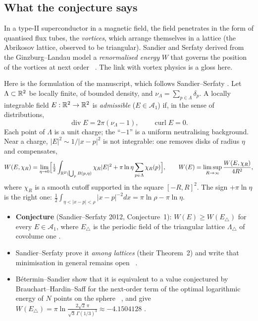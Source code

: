 \subsection{What the conjecture says}\label{ch2:ssec:ssconj}
\begin{physbox}
In a type-II superconductor in a magnetic field, the field penetrates in the form of quantised flux tubes,
the \emph{vortices}, which arrange themselves in a lattice (the Abrikosov lattice, observed to be triangular). Sandier and Serfaty
derived from the Ginzburg--Landau model a \emph{renormalised energy} $W$ that governs the position of the vortices at
next order~\cite{ch2ss} \tierL. The link with vortex physics is a \tierC{} gloss here.
\end{physbox}
Here is the formulation of the manuscript, which follows Sandier--Serfaty \tierL. Let $\Lambda\subset\mathbb{R}^2$ be locally
finite, of bounded density, and $\nu_\Lambda=\sum_{p\in\Lambda}\delta_p$. A locally integrable field $E:\mathbb{R}^2\to\mathbb{R}^2$ is
\emph{admissible} ($E\in\mathcal A_1$) if, in the sense of distributions,
\[\operatorname{div}E=2\pi(\nu_\Lambda-1),\qquad\operatorname{curl}E=0 .\]
Each point of $\Lambda$ is a unit charge; the ``$-1$'' is a uniform neutralising background. Near a charge,
$|E|^2\sim1/|x-p|^2$ is not integrable: one removes disks of radius $\eta$ and compensates,
\[W(E,\chi_R)=\lim_{\eta\to0}\Bigl[\tfrac12\int_{\mathbb{R}^2\setminus\bigcup_pB(p,\eta)}\chi_R|E|^2+\pi\ln\eta\sum_{p\in\Lambda}\chi_R(p)\Bigr],
\qquad W(E)=\limsup_{R\to\infty}\frac{W(E,\chi_R)}{4R^2},\]
where $\chi_R$ is a smooth cutoff supported in the square $[-R,R]^2$. The sign $+\pi\ln\eta$ is the right one:
$\frac12\int_{\eta<|x-p|<\rho}|x-p|^{-2}dx=\pi\ln\rho-\pi\ln\eta$.
\begin{itemize}
\item \textbf{Conjecture} (Sandier--Serfaty 2012, Conjecture~1): $W(E)\ge W(E_\triangle)$ for every $E\in\mathcal A_1$,
where $E_\triangle$ is the periodic field of the triangular lattice $\Lambda_\triangle$ of covolume one \tierL.
\item Sandier--Serfaty prove it \emph{among lattices} (their Theorem~2) and write that minimisation in
general remains open \tierL~\cite{ch2ss}.
\item Bétermin--Sandier show that it is equivalent to a value conjectured by Brauchart--Hardin--Saff for the
next-order term of the optimal logarithmic energy of $N$ points on the sphere~\cite{ch2bs,ch2bhs} \tierL, and give
$W(E_\triangle)=\pi\ln\frac{2\sqrt2\,\pi}{\sqrt3\,\Gamma(1/3)^3}\approx-4.1504128$ \tierL.
\end{itemize}

